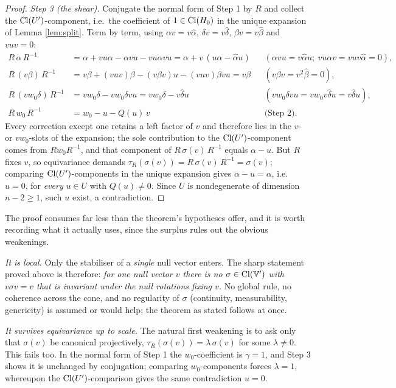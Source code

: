 \begin{proof}
\emph{Step 3 (the shear).} Conjugate the normal form of Step 1 by $R$ and collect the $\mathrm{Cl}(U')$-component, i.e.\ the coefficient of $1 \in \mathrm{Cl}(H_0)$ in the unique expansion of Lemma \ref{lem:split}. Term by term, using $\alpha v = v\hat\alpha$, $\delta v = v \hat\delta$, $\beta v = v\hat\beta$ and $vuv = 0$:
\begin{align*}
R\,\alpha\,R^{-1} &= \alpha + vu\alpha - \alpha vu - vu\alpha vu
= \alpha + v\,(u\alpha - \hat{\alpha}u) && (\alpha vu = v\hat\alpha u;\ vu\alpha v = vuv\hat\alpha = 0),\\
R\,(v\beta)\,R^{-1} &= v\beta + (vuv)\beta - (v\beta v)u - (vuv)\beta vu = v\beta && (v\beta v = v^2\hat\beta = 0),\\
R\,(v w_0 \delta)\,R^{-1} &= v w_0 \delta - v w_0 \delta v u = v w_0 \delta - v\hat{\delta}u && (v w_0 \delta v u = v w_0 v \hat{\delta} u = v \hat\delta u),\\
R\,w_0\,R^{-1} &= w_0 - u - Q(u)\,v && \text{(Step 2)}.
\end{align*}
Every correction except one retains a left factor of $v$ and therefore lies in the $v$- or $vw_0$-slots of the expansion; the sole contribution to the $\mathrm{Cl}(U')$-component comes from $R w_0 R^{-1}$, and that component of $R\,\sigma(v)\,R^{-1}$ equals $\alpha - u$. But $R$ fixes $v$, so equivariance demands $\tau_R(\sigma(v)) = R\,\sigma(v)\,R^{-1} = \sigma(v)$; comparing $\mathrm{Cl}(U')$-components in the unique expansion gives $\alpha - u = \alpha$, i.e.\ $u = 0$, for \emph{every} $u \in U$ with $Q(u) \neq 0$. Since $U$ is nondegenerate of dimension $n - 2 \geq 1$, such $u$ exist, a contradiction.
\end{proof}

\begin{remark}\label{rem:local}
The proof consumes far less than the theorem's hypotheses offer, and it is worth recording what it actually uses, since the surplus rules out the obvious weakenings.

\emph{It is local.} Only the stabiliser of a \emph{single} null vector enters. The sharp statement proved above is therefore: \emph{for one null vector $v$ there is no $\sigma \in \mathrm{Cl}(\mathbb{V}')$ with $v\sigma v = v$ that is invariant under the null rotations fixing $v$.} No global rule, no coherence across the cone, and no regularity of $\sigma$ (continuity, measurability, genericity) is assumed or would help; the theorem as stated follows at once.

\emph{It survives equivariance up to scale.} The natural first weakening is to ask only that $\sigma(v)$ be canonical projectively, $\tau_R(\sigma(v)) = \lambda\,\sigma(v)$ for some $\lambda \neq 0$. This fails too. In the normal form of Step 1 the $w_0$-coefficient is $\gamma = 1$, and Step 3 shows it is unchanged by conjugation; comparing $w_0$-components forces $\lambda = 1$, whereupon the $\mathrm{Cl}(U')$-comparison gives the same contradiction $u = 0$.
\end{remark}

